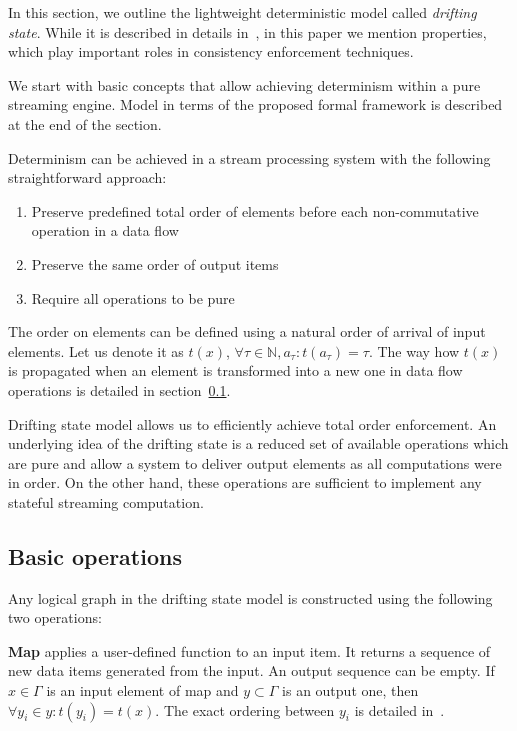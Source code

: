 
\label {fs-model-section}

In this section, we outline the lightweight deterministic model called {\em drifting state}. While it is described in details in~\cite{we2018adbis}, in this paper we mention properties, which play important roles in consistency enforcement techniques.

We start with basic concepts that allow achieving determinism within a pure streaming engine. Model in terms of the proposed formal framework is described at the end of the section.

Determinism can be achieved in a stream processing system with the following straightforward approach:
\begin{enumerate}
    \item Preserve predefined total order of elements before each non-commutative operation in a data flow
    \item Preserve the same order of output items
    \item Require all operations to be pure
\end{enumerate}

The order on elements can be defined using a natural order of   arrival of input elements. Let us denote it as $t(x)$, $\forall \tau \in \mathbb{N}, a_\tau :  t(a_\tau)=\tau$. The way how $t(x)$ is propagated when an element is transformed into a new one in data flow operations is detailed in section~\ref{ops}.

Drifting state model allows us to efficiently achieve total order enforcement. An underlying idea of the drifting state is a reduced set of available operations which are pure and allow a system to deliver output elements as all computations were in order. On the other hand, these operations are sufficient to implement any stateful streaming computation.

\subsection{Basic operations}
\label{ops}

Any logical graph in the drifting state model is constructed using the following two operations:

{\bf Map} applies a user-defined function to an input item. It returns a sequence of new data items generated from the input. An output sequence can be empty. If $x\in \Gamma$ is an input element of map and $y\subset \Gamma$ is an output one, then $\forall y_i \in y : t(y_i)=t(x)$. The exact ordering between $y_i$ is detailed in~\cite{we2018adbis}.

